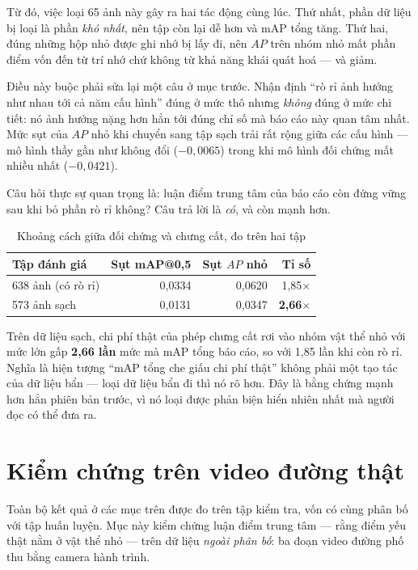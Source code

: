 Từ đó, việc loại 65 ảnh này gây ra hai tác động cùng lúc. Thứ nhất, phần dữ liệu bị loại là phần
\emph{khó nhất}, nên tập còn lại dễ hơn và mAP tổng tăng. Thứ hai, đúng những hộp nhỏ được ghi nhớ
bị lấy đi, nên $AP$ trên nhóm nhỏ mất phần điểm vốn đến từ trí nhớ chứ không từ khả năng khái quát
hoá --- và giảm.

Điều này buộc phải sửa lại một câu ở mục trước. Nhận định ``rò rỉ ảnh hưởng như nhau tới cả năm cấu
hình'' đúng ở mức thô nhưng \emph{không} đúng ở mức chi tiết: nó ảnh hưởng nặng hơn hẳn tới đúng chỉ
số mà báo cáo này quan tâm nhất. Mức sụt của $AP$ nhỏ khi chuyển sang tập sạch trải rất rộng giữa
các cấu hình --- mô hình thầy gần như không đổi ($-0{,}0065$) trong khi mô hình đối chứng mất nhiều
nhất ($-0{,}0421$).

Câu hỏi thực sự quan trọng là: luận điểm trung tâm của báo cáo còn đứng vững sau khi bỏ phần rò rỉ
không? Câu trả lời là \emph{có}, và còn mạnh hơn.

\begin{table}[H]
\centering
\caption{Khoảng cách giữa đối chứng và chưng cất, đo trên hai tập}
\label{tab:tapsach_kd}
\small
\begin{tabular}{lrrr}
\toprule
\textbf{Tập đánh giá} & \textbf{Sụt mAP@0,5} & \textbf{Sụt $AP$ nhỏ} & \textbf{Tỉ số} \\
\midrule
638 ảnh (có rò rỉ) & 0,0334 & 0,0620 & 1,85$\times$ \\
573 ảnh sạch       & 0,0131 & 0,0347 & \textbf{2,66$\times$} \\
\bottomrule
\end{tabular}
\end{table}

Trên dữ liệu sạch, chi phí thật của phép chưng cất rơi vào nhóm vật thể nhỏ với mức lớn gấp
\textbf{2,66 lần} mức mà mAP tổng báo cáo, so với 1,85 lần khi còn rò rỉ. Nghĩa là hiện tượng ``mAP
tổng che giấu chi phí thật'' không phải một tạo tác của dữ liệu bẩn --- loại dữ liệu bẩn đi thì nó
rõ hơn. Đây là bằng chứng mạnh hơn hẳn phiên bản trước, vì nó loại được phản biện hiển nhiên nhất mà
người đọc có thể đưa ra.

\section{Kiểm chứng trên video đường thật}
\label{sec:video}

Toàn bộ kết quả ở các mục trên được đo trên tập kiểm tra, vốn có cùng phân bố với tập huấn luyện.
Mục này kiểm chứng luận điểm trung tâm --- rằng điểm yếu thật nằm ở vật thể nhỏ --- trên dữ liệu
\emph{ngoài phân bố}: ba đoạn video đường phố thu bằng camera hành trình.

